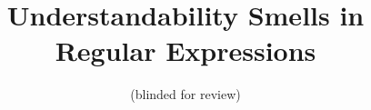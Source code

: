 \documentclass[10pt,conference]{IEEEtran}
\begin{document}
%
\title{Understandability Smells in Regular Expressions}

\author{(blinded for review)}




\maketitle
\end{document}
